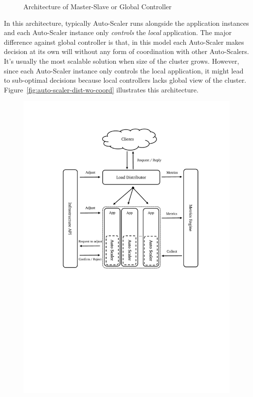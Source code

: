 \begin{description}[leftmargin=0pt]
\begin{figure}[hb]
        \centering
        \caption{Architecture of Master-Slave or Global Controller}
        \label{fig:auto-scaler-master-backup}
    \end{figure}
    \clearpage
    \item[Distributed Without Coorindation] In this architecture, typically Auto-Scaler runs alongside the application instances and each Auto-Scaler instance only \emph{controls} the \emph{local} application. The major difference against global controller is that, in this model each Auto-Scaler makes decision at its own will without any form of coordination with other Auto-Scalers. It's usually the most scalable solution when size of the cluster grows. However, since each Auto-Scaler instance only controls the local application, it might lead to sub-optimal decisions because local controllers lacks global view of the cluster. Figure~\ref{fig:auto-scaler-dist-wo-coord} illustrates this architecture.
    \begin{figure}[hb]
        \includegraphics[clip, trim=3cm 12.2cm 2.5cm 2.5cm]{auto-scaler-full-dist.pdf}

\end{figure}
\end{description}
